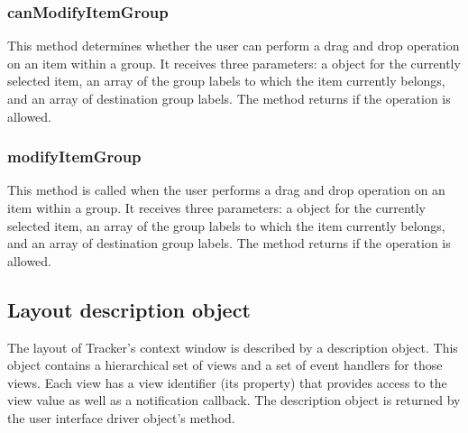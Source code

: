 \documentclass[letterpaper,12pt,english,openany,oneside]{sphinxmanual}
\begin{document}
\subsubsection{canModifyItemGroup}
\label{\detokenize{Tracker_InboxAPI:canmodifyitemgroup}}
This method determines whether the user can perform a drag and drop operation on an item within a group. It receives three parameters: a  object for the currently selected item, an array of the group labels to which the item currently belongs, and an array of destination group labels. The method returns  if the operation is allowed.




\subsubsection{modifyItemGroup}
\label{\detokenize{Tracker_InboxAPI:modifyitemgroup}}
This method is called when the user performs a drag and drop operation on an item within a group. It receives three parameters: a  object for the currently selected item, an array of the group labels to which the item currently belongs, and an array of destination group labels. The method returns  if the operation is allowed.




\subsection{Layout description object}
\label{\detokenize{Tracker_InboxAPI:layout-description-object}}
The layout of Tracker’s context window is described by a  description object. This object contains a hierarchical set of views and a set of event handlers for those views. Each view has a view identifier (its  property) that provides access to the view value as well as a notification callback. The  description object is returned by the user interface driver object’s  method.
\end{document}
